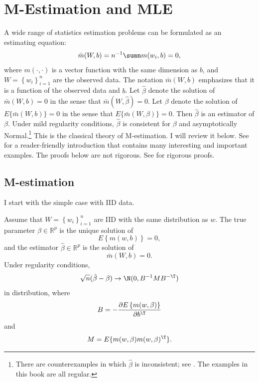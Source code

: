  
\chapter{M-Estimation and MLE}
\label{chapter::m-mle} 

 
A wide range of statistics estimation problems can be formulated as an estimating equation:
$$
\bar{m}(W,b) = n^{-1}\sumn m(w_{i},b) = 0, 
$$
where $m(\cdot, \cdot)$ is a vector function with the same dimension as $b$, and $W = \left\{ w_{i}\right\} _{i=1}^{n}$ are the observed data. The notation $\bar{m}(W,b)$ emphasizes that it is a function of the observed data and $b$. 
Let $\hat{\beta} $ denote the solution of $\bar{m}(W,b) = 0$ in the sense that $\bar{m}(W, \hat{\beta}) = 0$. 
Let $\beta$ denote the solution of $E\{ \bar{m}(W,b) \} = 0$ in the sense that $E\{ \bar{m}(W,  \beta) \} = 0$. 
Then $\hat{\beta} $ is an estimator of $\beta$. Under mild regularity conditions,  $\hat{\beta} $ is consistent for $\beta$ and asymptotically Normal.\footnote{There are counterexamples in which $\hat{\beta} $ is inconsistent; see \citet{freedman1982inconsistent}. The examples in this book are all regular.}
This is the classical theory of M-estimation. I will review it below. See \citet{stefanski2002calculus} for a reader-friendly introduction that contains many interesting and important examples. The proofs below are not rigorous. 
See \citet{newey1994large} for rigorous proofs. 


\section{M-estimation}



I start with the simple case with IID data. 


\begin{theorem}
\label{theorem:sandwich-theorem-cov-iid}Assume that $W = \left\{ w_{i}\right\} _{i=1}^{n}$ are IID with the same distribution as $w$.
The true parameter $\beta\in\mathbb{R}^{p}$ is the unique solution of  
\[
E\left\{ m(w,b)\right\} =0,
\]
and the estimator $\hat{\beta}\in\mathbb{R}^{p}$ is the solution of
\[
\bar{m}(W,b)  =0 . 
\]
Under regularity conditions, 
\[
\sqrt{n}(\hat{\beta}-\beta)\rightarrow\N(0,B^{-1}MB^{-\T})
\]
in distribution, where 
$$
B   = -  \frac{\partial E\left\{ m(w,\beta) \right\} }{\partial b^{\T}}
$$
and
$$
M = E\{  m(w,\beta) m(w,\beta)^{\T}\}  .
$$
\end{theorem}







